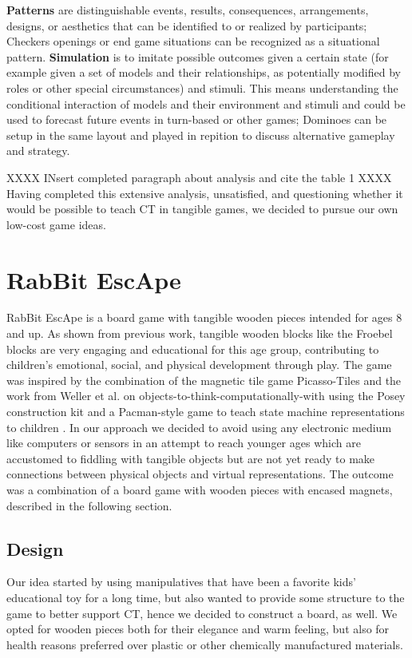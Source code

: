 \documentclass{acm_proc_article-sp}
\begin{document}
\textbf{Patterns} are distinguishable events, results, consequences, arrangements, designs, or aesthetics that can be identified to or realized by participants; Checkers openings or end game situations can be recognized as a situational pattern.
\textbf{Simulation} is to imitate possible outcomes given a certain state (for example given a set of models and their relationships, as potentially modified by roles or other special circumstances) and stimuli.
This means understanding the conditional interaction of models and their environment and stimuli and could be used to forecast future events in turn-based or other games; Dominoes can be setup in the same layout and played in repition to discuss alternative gameplay and strategy.

XXXX INsert completed paragraph about analysis and cite the table 1 XXXX
Having completed this extensive analysis, unsatisfied, and questioning whether it would be possible to teach CT in tangible games, we decided to pursue our own low-cost game ideas.

\section{RabBit EscApe}
\label{sec:rabbit}
RabBit EscApe is a board game with tangible wooden pieces intended for ages 8 and up.
As shown from previous work, tangible wooden blocks like the Froebel blocks\cite{liebschner1992child} are very engaging and educational for this age group, contributing to children's emotional, social, and physical development through play.
The game was inspired by the combination of the magnetic tile game Picasso-Tiles\cite{picassotiles3d} and the work from Weller et al. on objects-to-think-computationally-with using the Posey construction kit and a Pacman-style game to teach state machine representations to children \cite{weller2008escape}.
In our approach we decided to avoid using any electronic medium like computers or sensors in an attempt to reach younger ages which are accustomed to fiddling with tangible objects but are not yet ready to make connections between physical objects and virtual representations.
The outcome was a combination of a board game with wooden pieces with encased magnets, described in the following section.

\subsection{Design}
\label{sec:design}
Our idea started by using manipulatives that have been a favorite kids' educational toy for a long time, but also wanted to provide some structure to the game to better support CT, hence we decided to construct a board, as well.
We opted for wooden pieces both for their elegance and warm feeling, but also for health reasons preferred over plastic or other chemically manufactured materials. 
\end{document}
